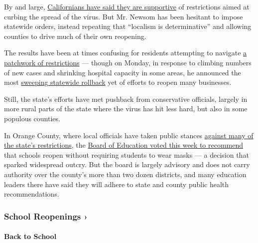 By and large,
\href{https://www.nytimes3xbfgragh.onion/2020/06/04/us/california-newsom-coronavirus.html}{Californians
have said they are supportive} of restrictions aimed at curbing the
spread of the virus. But Mr. Newsom has been hesitant to impose
statewide orders, instead repeating that ``localism is determinative''
and allowing counties to drive much of their own reopening.

The results have been at times confusing for residents attempting to
navigate
\href{https://www.nytimes3xbfgragh.onion/article/coronavirus-california-reopening-phases.html}{a
patchwork of restrictions} --- though on Monday, in response to climbing
numbers of new cases and shrinking hospital capacity in some areas, he
announced the most
\href{https://www.nytimes3xbfgragh.onion/2020/07/14/us/california-counties-reopening.html}{sweeping
statewide rollback} yet of efforts to reopen many businesses.

Still, the state's efforts have met pushback from conservative
officials, largely in more rural parts of the state where the virus has
hit less hard, but also in some populous counties.

In Orange County, where local officials have taken public stances
\href{https://www.nytimes3xbfgragh.onion/aponline/2020/07/14/us/ap-us-virus-outbreak-school-politics.html}{against
many of the state's restrictions}, the
\href{https://www.ocregister.com/2020/07/15/wagner-chau-back-away-from-controversial-school-board-recommendation/}{Board
of Education voted this week to recommend} that schools reopen without
requiring students to wear masks --- a decision that sparked widespread
outcry. But the board is largely advisory and does not carry authority
over the county's more than two dozen districts, and many education
leaders there have said they will adhere to state and county public
health recommendations.

\href{https://www.nytimes3xbfgragh.onion/spotlight/schools-reopening?action=click\&pgtype=Article\&state=default\&region=MAIN_CONTENT_3\&context=storylines_keepup}{}

\hypertarget{school-reopenings-}{%
\subsubsection{School Reopenings ›}\label{school-reopenings-}}

\hypertarget{back-to-school}{%
\paragraph{Back to School}\label{back-to-school}}

